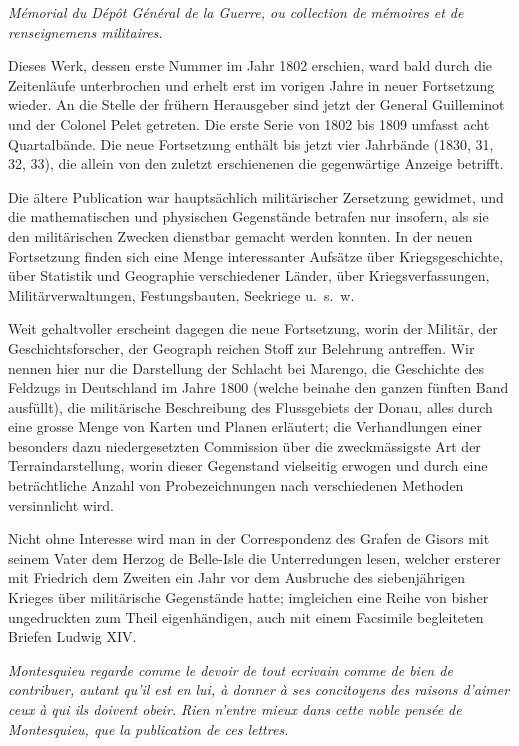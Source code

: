 \documentclass[fontsize=10pt,paper=a5,pagesize,headings=small,headinclude=true,footinclude=true]{scrbook}
\begin{document}
\textit{Mémorial du Dépôt Général de la Guerre, ou collection de mémoires et de renseignemens militaires.}

Dieses Werk, dessen erste Nummer im Jahr 1802 erschien, ward bald durch die Zeitenläufe unterbrochen und erhelt erst im vorigen Jahre in neuer Fortsetzung wieder. An die Stelle der frühern Herausgeber sind jetzt der General Guilleminot und der Colonel Pelet getreten. Die erste Serie von 1802 bis 1809 umfasst acht Quartalbände. Die neue Fortsetzung enthält bis jetzt vier Jahrbände (1830, 31, 32, 33), die allein von den zuletzt erschienenen die gegenwärtige Anzeige betrifft.

Die ältere Publication war hauptsächlich militärischer Zersetzung gewidmet, und die mathematischen und physischen Gegenstände betrafen nur insofern, als sie den militärischen Zwecken dienstbar gemacht werden konnten. In der neuen Fortsetzung finden sich eine Menge interessanter Aufsätze über Kriegsgeschichte, über Statistik und Geographie verschiedener Länder, über Kriegsverfassungen, Militärverwaltungen, Festungsbauten, Seekriege u.~s.~w.

Weit gehaltvoller erscheint dagegen die neue Fortsetzung, worin der Militär, der Geschichtsforscher, der Geograph reichen Stoff zur Belehrung antreffen. Wir nennen hier nur die Darstellung der Schlacht bei Marengo, die Geschichte des Feldzugs in Deutschland im Jahre 1800 (welche beinahe den ganzen fünften Band ausfüllt), die militärische Beschreibung des Flussgebiets der Donau, alles durch eine grosse Menge von Karten und Planen erläutert; die Verhandlungen einer besonders dazu niedergesetzten Commission über die zweckmässigste Art der Terraindarstellung, worin dieser Gegenstand vielseitig erwogen und durch eine beträchtliche Anzahl von Probezeichnungen nach verschiedenen Methoden versinnlicht wird.

Nicht ohne Interesse wird man in der Correspondenz des Grafen de Gisors mit seinem Vater dem Herzog de Belle-Isle die Unterredungen lesen, welcher ersterer mit Friedrich dem Zweiten ein Jahr vor dem Ausbruche des siebenjährigen Krieges über militärische Gegenstände hatte; imgleichen eine Reihe von bisher ungedruckten zum Theil eigenhändigen, auch mit einem Facsimile begleiteten Briefen Ludwig XIV.

\textit{Montesquieu regarde comme le devoir de tout ecrivain comme de bien de contribuer, autant qu'il est en lui, à donner à ses concitoyens des raisons d'aimer ceux à qui ils doivent obeir. Rien n'entre mieux dans cette noble pensée de Montesquieu, que la publication de ces lettres.}
\end{document}
